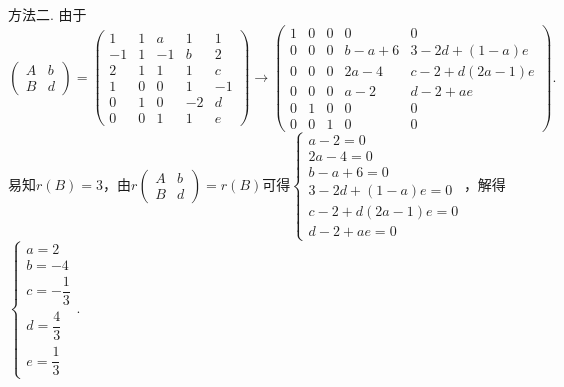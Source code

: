 \documentclass[UTF8,12pt,a4paper,fontset=fandol]{ctexart}
\begin{document}
\begin{solve}
        方法二. 由于
        \[\begin{pmatrix}
                A & b \\
                B & d
            \end{pmatrix}=
            \begin{pmatrix}
                1  & 1 & a  & 1  & 1  \\
                -1 & 1 & -1 & b  & 2  \\
                2  & 1 & 1  & 1  & c  \\
                1  & 0 & 0  & 1  & -1 \\
                0  & 1 & 0  & -2 & d  \\
                0  & 0 & 1  & 1  & e
            \end{pmatrix}\rightarrow
            \begin{pmatrix}
                1 & 0 & 0 & 0     & 0            \\
                0 & 0 & 0 & b-a+6 & 3-2d+(1-a)e  \\
                0 & 0 & 0 & 2a-4  & c-2+d(2a-1)e \\
                0 & 0 & 0 & a-2   & d-2+ae       \\
                0 & 1 & 0 & 0     & 0            \\
                0 & 0 & 1 & 0     & 0
            \end{pmatrix}.\]
        易知$r(B)=3$，由$r\begin{pmatrix}
                A & b \\
                B & d
            \end{pmatrix}=r(B)$可得$\begin{cases}
                a-2=0          \\
                2a-4=0         \\
                b-a+6=0        \\
                3-2d+(1-a)e=0  \\
                c-2+d(2a-1)e=0 \\
                d-2+ae=0
            \end{cases}$，解得$\begin{cases}
                a=2          \\
                b=-4         \\
                c=-\dfrac 13 \\[1ex]
                d=\dfrac 43  \\[1ex]
                e=\dfrac 13
            \end{cases}$.
\end{solve}
\end{document}
